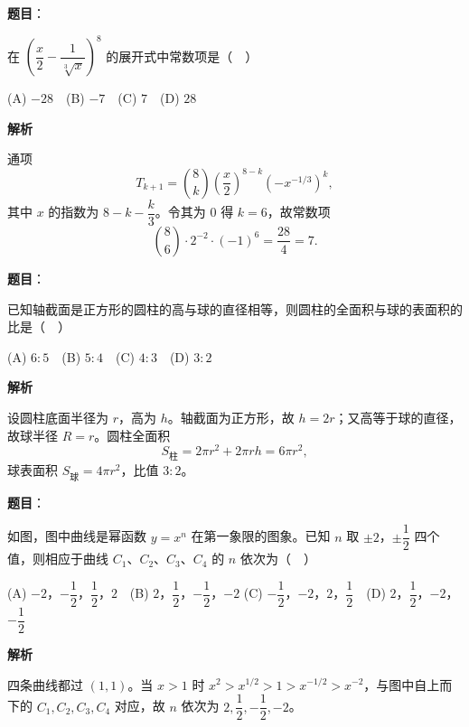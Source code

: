 \begin{answer}

\textbf{题目}：

在 \(\left(\dfrac{x}{2}-\dfrac{1}{\sqrt[3]{x}}\right)^8\) 的展开式中常数项是（　）

(A) \(-28\)　(B) \(-7\)　(C) \(7\)　(D) \(28\)

\textbf{解析}

通项
\nopagebreak[4]
\[
T_{k+1}=\binom8k\left(\frac x2\right)^{8-k}\left(-x^{-1/3}\right)^k,
\]
其中 \(x\) 的指数为 \(8-k-\dfrac k3\)。令其为 0 得 \(k=6\)，故常数项
\nopagebreak[4]
\[
\binom86\cdot2^{-2}\cdot(-1)^6=\frac{28}{4}=7.
\]


\end{answer}
\begin{answer}

\textbf{题目}：

已知轴截面是正方形的圆柱的高与球的直径相等，则圆柱的全面积与球的表面积的比是（　）

(A) \(6:5\)　(B) \(5:4\)　(C) \(4:3\)　(D) \(3:2\)

\textbf{解析}

设圆柱底面半径为 \(r\)，高为 \(h\)。轴截面为正方形，故 \(h=2r\)；又高等于球的直径，故球半径 \(R=r\)。圆柱全面积
\nopagebreak[4]
\[
S_{\text{柱}}=2\pi r^2+2\pi rh=6\pi r^2,
\]
球表面积 \(S_{\text{球}}=4\pi r^2\)，比值 \(3:2\)。


\end{answer}
\begin{answer}

\textbf{题目}：

如图，图中曲线是幂函数 \(y=x^n\) 在第一象限的图象。已知 \(n\) 取 \(\pm 2\)，\(\pm\dfrac{1}{2}\) 四个值，则相应于曲线 \(C_1\)、\(C_2\)、\(C_3\)、\(C_4\) 的 \(n\) 依次为（　）
\nopagebreak[4]
\begin{center}\end{center}
\nopagebreak[4]
(A) \(-2\)，\(-\dfrac{1}{2}\)，\(\dfrac{1}{2}\)，\(2\)　(B) \(2\)，\(\dfrac{1}{2}\)，\(-\dfrac{1}{2}\)，\(-2\)
(C) \(-\dfrac{1}{2}\)，\(-2\)，\(2\)，\(\dfrac{1}{2}\)　(D) \(2\)，\(\dfrac{1}{2}\)，\(-2\)，\(-\dfrac{1}{2}\)

\textbf{解析}

四条曲线都过 \((1,1)\)。当 \(x>1\) 时 \(x^2>x^{1/2}>1>x^{-1/2}>x^{-2}\)，与图中自上而下的 \(C_1,C_2,C_3,C_4\) 对应，故 \(n\) 依次为 \(2,\dfrac12,-\dfrac12,-2\)。


\end{answer}
